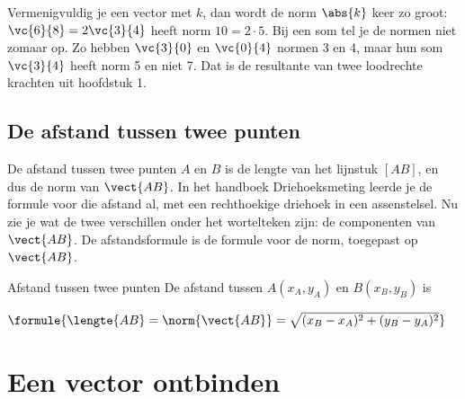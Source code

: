 Vermenigvuldig je een vector met $k$, dan wordt de norm $\abs{k}$ keer zo groot: $\vc{6}{8} = 2\vc{3}{4}$ heeft norm $10 = 2 \cdot 5$. Bij een som tel je de normen niet zomaar op. Zo hebben $\vc{3}{0}$ en $\vc{0}{4}$ normen 3 en 4, maar hun som $\vc{3}{4}$ heeft norm 5 en niet 7. Dat is de resultante van twee loodrechte krachten uit hoofdstuk 1.

\begin{oefeningen}
\end{oefeningen}

\subsection{De afstand tussen twee punten}

De afstand tussen twee punten $A$ en $B$ is de lengte van het lijnstuk $[AB]$, en dus de norm van $\vect{AB}$. In het handboek Driehoeksmeting leerde je de formule voor die afstand al, met een rechthoekige driehoek in een assenstelsel. Nu zie je wat de twee verschillen onder het wortelteken zijn: de componenten van $\vect{AB}$. De afstandsformule is de formule voor de norm, toegepast op $\vect{AB}$.

\begin{theorie}
\begin{stelling}{Afstand tussen twee punten}
De afstand tussen $A(x_A, y_A)$ en $B(x_B, y_B)$ is

\vspace{1mm}
\qquad $\formule{\lengte{AB} = \norm{\vect{AB}} = \sqrt{(x_B - x_A)^2 + (y_B - y_A)^2}}$
\end{stelling}
\end{theorie}


\begin{oefeningen}
\end{oefeningen}

\section{Een vector ontbinden}

